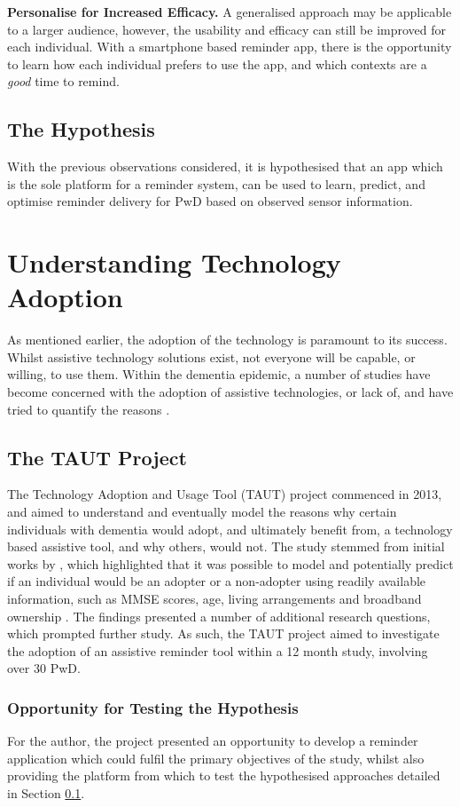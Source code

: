 \textbf{Personalise for Increased Efficacy.}
A generalised approach may be applicable to a larger audience, however, the usability and efficacy can still be improved for each individual. With a smartphone based reminder app, there is the opportunity to learn how each individual prefers to use the app, and which contexts are a \textit{good} time to remind.

\subsection{The Hypothesis} \label{section: taut-hypothesis}
With the previous observations considered, it is hypothesised that an app which is the sole platform for a reminder system, can be used to learn, predict, and optimise reminder delivery for PwD based on observed sensor information.

\section{Understanding Technology Adoption}
As mentioned earlier, the adoption of the technology is paramount to its success. Whilst assistive technology solutions exist, not everyone will be capable, or willing, to use them. Within the dementia epidemic, a number of studies have become concerned with the adoption of assistive technologies, or lack of, and have tried to quantify the reasons \cite{ONeill2013, Renaud2008,IMSmHealth2015}. 

\subsection{The TAUT Project}
The Technology Adoption and Usage Tool (TAUT) project commenced in 2013, and aimed to understand and eventually model the reasons why certain individuals with dementia would adopt, and ultimately benefit from, a technology based assistive tool, and why others, would not. The study stemmed from initial works by \citeauthor{Zhang2013}, which highlighted that it was possible to model and potentially predict if an individual would be an adopter or a non-adopter using readily available information, such as MMSE scores, age, living arrangements and broadband ownership \cite{Zhang2013}. The findings presented a number of additional research questions, which prompted further study. As such, the TAUT project aimed to investigate the adoption of an assistive reminder tool within a 12 month study, involving over 30 PwD.

\subsubsection{Opportunity for Testing the Hypothesis}
For the author, the project presented an opportunity to develop a reminder application which could fulfil the primary objectives of the study, whilst also providing the platform from which to test the hypothesised approaches detailed in Section \ref{section: taut-hypothesis}.

